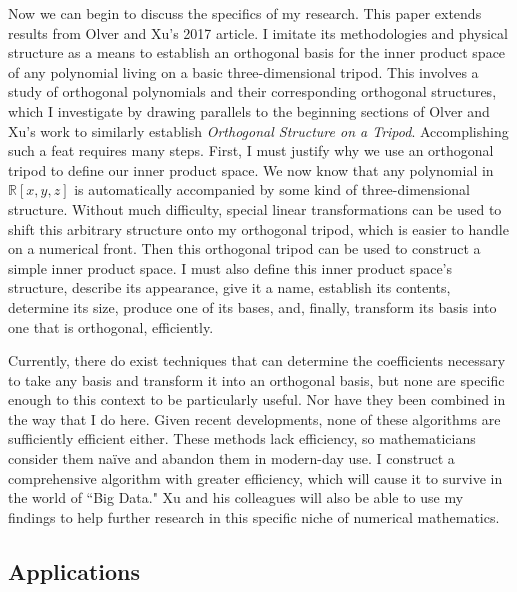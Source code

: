 \documentclass[letterpaper, 12pt]{article}
\begin{document}
Now we can begin to discuss the specifics of my research. This paper extends results from Olver and Xu's 2017 article. I imitate its methodologies and physical structure as a means to establish an orthogonal basis for the inner product space of any polynomial living on a basic three-dimensional tripod. This involves a study of orthogonal polynomials and their corresponding orthogonal structures, which I investigate by drawing parallels to the beginning sections of Olver and Xu's work to similarly establish \textit{Orthogonal Structure on a Tripod}. Accomplishing such a feat requires many steps. First, I must justify why we use an orthogonal tripod to define our inner product space. We now know that any polynomial in $\mathbb{R}[x, y, z]$ is automatically accompanied by some kind of three-dimensional structure. Without much difficulty, special linear transformations can be used to shift this arbitrary structure onto my orthogonal tripod, which is easier to handle on a numerical front. Then this orthogonal tripod can be used to construct a simple inner product space. I must also define this inner product space's structure, describe its appearance, give it a name, establish its contents, determine its size, produce one of its bases, and, finally, transform its basis into one that is orthogonal, efficiently.

Currently, there do exist techniques that can determine the coefficients necessary to take any basis and transform it into an orthogonal basis, but none are specific enough to this context to be particularly useful. Nor have they been combined in the way that I do here. Given recent developments, none of these algorithms are sufficiently efficient either. These methods lack efficiency, so mathematicians consider them na\"ive and abandon them in modern-day use. I construct a comprehensive algorithm with greater efficiency, which will cause it to survive in the world of ``Big Data." Xu and his colleagues will also be able to use my findings to help further research in this specific niche of numerical mathematics.







\newpage
\begin{centering}\section{Applications}\end{centering}
\end{document}
